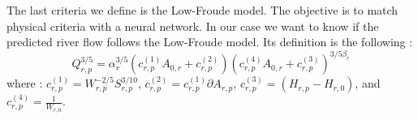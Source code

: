 The last criteria we define is the Low-Froude model. The objective is to match physical criteria with a neural network. In our case we want to know if the predicted river flow follows the Low-Froude model. Its definition is the following :
\begin{equation}
    Q^{3/5}_{r,p} = \alpha_r^{3/5} ( c_{r,p}^{(1)} A_{0,r} + c_{r,p}^{(2)})(c_{r,p}^{(4)}A_{0,r} + c_{r,p}^{(3)})^{3/5\beta_r}
    \label{eq:low froude}
\end{equation}
where : $ c_{r,p}^{(1)} = W_{r,p}^{-2/5}S_{r,p}^{3/10}$, $ c_{r,p}^{(2)} = c_{r,p}^{(1)} \partial A_{r,p}$, $ c_{r,p}^{(3)} = (H_{r,p} - H_{r,0})$, and  $ c_{r,p}^{(4)} = \frac{1}{W_{r,0}}$.


